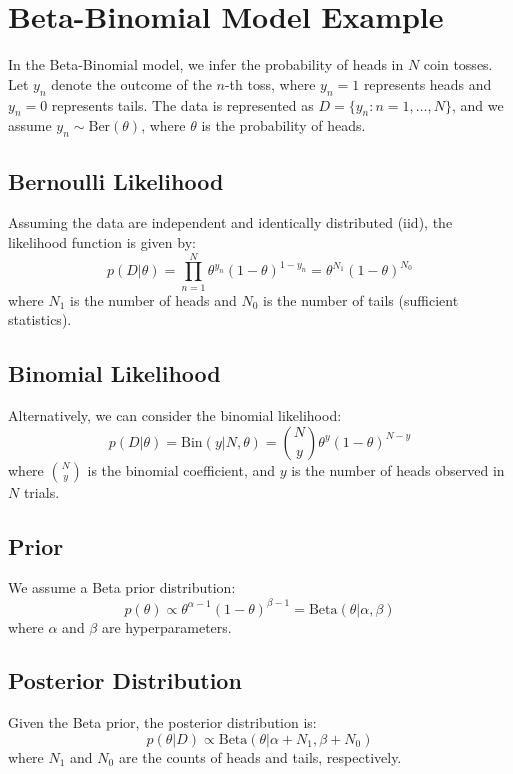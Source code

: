 \documentclass{article}
\begin{document}
\section*{Beta-Binomial Model Example}

In the Beta-Binomial model, we infer the probability of heads in $N$ coin tosses. Let $y_n$ denote the outcome of the $n$-th toss, where $y_n = 1$ represents heads and $y_n = 0$ represents tails. The data is represented as $D = \{y_n : n = 1, \dots, N\}$, and we assume $y_n \sim \text{Ber}(\theta)$, where $\theta$ is the probability of heads.

\subsection*{Bernoulli Likelihood}

Assuming the data are independent and identically distributed (iid), the likelihood function is given by:
\[
p(D|\theta) = \prod_{n=1}^{N} \theta^{y_n} (1 - \theta)^{1 - y_n} = \theta^{N_1} (1 - \theta)^{N_0}
\]
where $N_1$ is the number of heads and $N_0$ is the number of tails (sufficient statistics).

\subsection*{Binomial Likelihood}

Alternatively, we can consider the binomial likelihood:
\[
p(D|\theta) = \text{Bin}(y|N, \theta) = \binom{N}{y} \theta^y (1 - \theta)^{N - y}
\]
where $\binom{N}{y}$ is the binomial coefficient, and $y$ is the number of heads observed in $N$ trials.

\subsection*{Prior}

We assume a Beta prior distribution:
\[
p(\theta) \propto \theta^{\alpha - 1} (1 - \theta)^{\beta - 1} = \text{Beta}(\theta | \alpha, \beta)
\]
where $\alpha$ and $\beta$ are hyperparameters.

\subsection*{Posterior Distribution}

Given the Beta prior, the posterior distribution is:
\[
p(\theta | D) \propto \text{Beta}(\theta | \alpha + N_1, \beta + N_0)
\]
where $N_1$ and $N_0$ are the counts of heads and tails, respectively.
\end{document}
